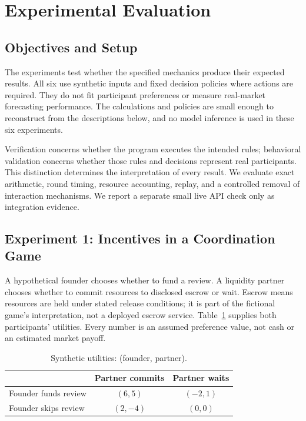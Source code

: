 \section{Experimental Evaluation}\label{sec:results}
\subsection{Objectives and Setup}
The experiments test whether the specified mechanics produce their expected
results. All six use synthetic inputs and fixed decision policies where
actions are required. They do not fit participant preferences or measure
real-market forecasting performance. The calculations and policies are small
enough to reconstruct from the descriptions below, and no model inference is
used in these six experiments.

Verification concerns whether the program executes the intended rules;
behavioral validation concerns whether those rules and decisions represent
real participants. This distinction determines the interpretation of every
result. We evaluate exact arithmetic, round timing, resource accounting,
replay, and a controlled removal of interaction mechanisms. We report a
separate small live API check only as integration evidence.

\subsection{Experiment 1: Incentives in a Coordination Game}
A hypothetical founder chooses whether to fund a review. A liquidity partner
chooses whether to commit resources to disclosed escrow or wait. Escrow means
resources are held under stated release conditions; it is part of the
fictional game's interpretation, not a deployed escrow service.
Table~\ref{tab:game} supplies both participants' utilities. Every number is an
assumed preference value, not cash or an estimated market payoff.

\begin{table}[t]
\caption{Synthetic utilities: (founder, partner).}
\label{tab:game}
\centering\footnotesize
\begin{tabular}{@{}lcc@{}}
\toprule & Partner commits & Partner waits \\
\midrule
Founder funds review & $(6,5)$ & $(-2,1)$ \\
Founder skips review & $(2,-4)$ & $(0,0)$ \\
\bottomrule
\end{tabular}
\end{table}

